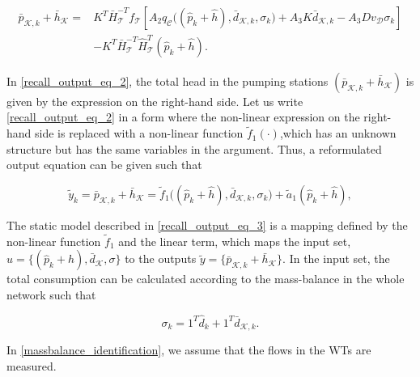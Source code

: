 \vspace{-4mm}
\begin{align}
  \label{recall_output_eq_2}
      \bar{p}_{\mathcal{K},k} + \bar{h}_{\mathcal{K}} = & \nonumber K^T \bar{H}^{-T}_{\mathcal{T}}f_{\mathcal{T}}[A_2 q_{\mathcal{C}}\big ((\hat{p}_k + \hat{h}),\bar{d}_{\mathcal{K},k}, \sigma_k \big) + A_3 K \bar{d}_{\mathcal{K},k} - A_3 D v_{\mathcal{D}} \sigma_k]   \\ &  - K^T\bar{H}^{-T}_{\mathcal{T}}\hat{H}^{T}_{\mathcal{T}} (\hat{p}_k + \hat{h}) .
\end{align}

\vspace{-4mm}
In \eqref{recall_output_eq_2}, the total head in the pumping stations $(\bar{p}_{\mathcal{K},k} + \bar{h}_{\mathcal{K}})$ is given by the expression on the right-hand side. Let us write \eqref{recall_output_eq_2} in a form where the non-linear expression on the right-hand side is replaced with a non-linear function $\tilde{f}_1(\cdot)$,which has an unknown structure but has the same variables in the argument. Thus, a reformulated output equation can be given such that 

 \begin{equation}
  \label{recall_output_eq_3}
     \tilde{y}_k = \bar{p}_{\mathcal{K},k} + \bar{h}_{\mathcal{K}} = \tilde{f}_1 \big((\hat{p}_k + \hat{h}),\bar{d}_{\mathcal{K},k}, \sigma_k\big) + \tilde{a}_1 (\hat{p}_k + \hat{h}), 
\end{equation} 



The static model described in \eqref{recall_output_eq_3} is a mapping defined by the non-linear function $\tilde{f}_1$ and the linear term, which maps the input set, $u = \{(\hat{p}_k + \hat{h}), \bar{d}_{\mathcal{K}}, \sigma \}$ to the outputs $\tilde{y} = \{ \bar{p}_{\mathcal{K},k} + \bar{h}_{\mathcal{K}} \}$. In the input set, the total consumption can be calculated according to the mass-balance in the whole network such that

\begin{equation}
\label{massbalance_identification}
 \sigma_k = 1^T \hat{d}_k + 1^T \bar{d}_{\mathcal{K},k}.
\end{equation}

 In \eqref{massbalance_identification}, we assume that the flows in the WTs are measured. 


